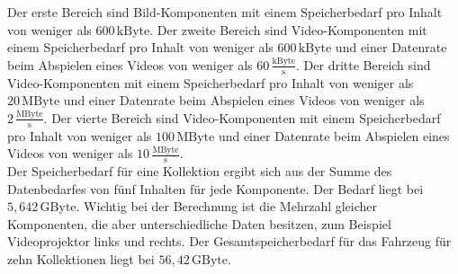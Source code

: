 Der erste Bereich sind Bild-Komponenten mit einem Speicherbedarf pro Inhalt von weniger als $ 600\,\mathrm{kByte} $. Der zweite Bereich sind Video-Komponenten mit einem Speicherbedarf pro Inhalt von weniger als $ 600\,\mathrm{kByte} $ und einer Datenrate beim Abspielen eines Videos von weniger als $ 60\,\frac{\mathrm{kByte}}{\mathrm{s}} $. Der dritte Bereich sind Video-Komponenten mit einem Speicherbedarf pro Inhalt von weniger als $ 20\,\mathrm{MByte} $ und einer Datenrate beim Abspielen eines Videos von weniger als $ 2\,\frac{\mathrm{MByte}}{\mathrm{s}} $. Der vierte Bereich sind Video-Komponenten mit einem Speicherbedarf pro Inhalt von weniger als $ 100\,\mathrm{MByte} $ und einer Datenrate beim Abspielen eines Videos von weniger als $ 10\,\frac{\mathrm{MByte}}{\mathrm{s}} $. \\
Der Speicherbedarf für eine Kollektion ergibt sich aus der Summe des Datenbedarfes von fünf Inhalten für jede Komponente. Der Bedarf liegt bei $ 5,642\,\mathrm{GByte} $. Wichtig bei der Berechnung ist die Mehrzahl gleicher Komponenten, die aber unterschiedliche Daten besitzen, zum Beispiel Videoprojektor links und rechts. Der Gesamtspeicherbedarf für das Fahrzeug für zehn Kollektionen liegt bei $ 56,42\,\mathrm{GByte} $.
